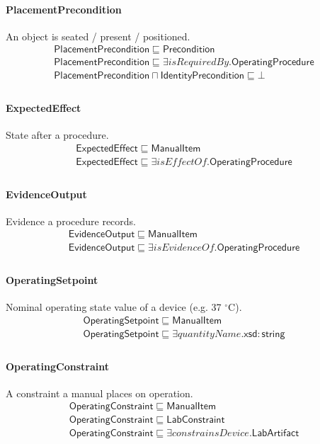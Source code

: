 \documentclass[10pt]{article}
\begin{document}
\paragraph{PlacementPrecondition} An object is seated / present / positioned.
\[\begin{array}{l}
\mathsf{PlacementPrecondition} \sqsubseteq  \mathsf{Precondition} \\
\mathsf{PlacementPrecondition} \sqsubseteq  \exists \mathit{isRequiredBy}.\mathsf{OperatingProcedure} \\
\mathsf{PlacementPrecondition} \sqcap  \mathsf{IdentityPrecondition} \sqsubseteq  \bot  \\
\end{array}\]
\paragraph{ExpectedEffect} State after a procedure.
\[\begin{array}{l}
\mathsf{ExpectedEffect} \sqsubseteq  \mathsf{ManualItem} \\
\mathsf{ExpectedEffect} \sqsubseteq  \exists \mathit{isEffectOf}.\mathsf{OperatingProcedure} \\
\end{array}\]
\paragraph{EvidenceOutput} Evidence a procedure records.
\[\begin{array}{l}
\mathsf{EvidenceOutput} \sqsubseteq  \mathsf{ManualItem} \\
\mathsf{EvidenceOutput} \sqsubseteq  \exists \mathit{isEvidenceOf}.\mathsf{OperatingProcedure} \\
\end{array}\]
\paragraph{OperatingSetpoint} Nominal operating state value of a device (e.g. 37 $^\circ$C).
\[\begin{array}{l}
\mathsf{OperatingSetpoint} \sqsubseteq  \mathsf{ManualItem} \\
\mathsf{OperatingSetpoint} \sqsubseteq  \exists \mathit{quantityName}.\mathsf{xsd{:}string} \\
\end{array}\]
\paragraph{OperatingConstraint} A constraint a manual places on operation.
\[\begin{array}{l}
\mathsf{OperatingConstraint} \sqsubseteq  \mathsf{ManualItem} \\
\mathsf{OperatingConstraint} \sqsubseteq  \mathsf{LabConstraint} \\
\mathsf{OperatingConstraint} \sqsubseteq  \exists \mathit{constrainsDevice}.\mathsf{LabArtifact} \\
\end{array}\]
\end{document}
